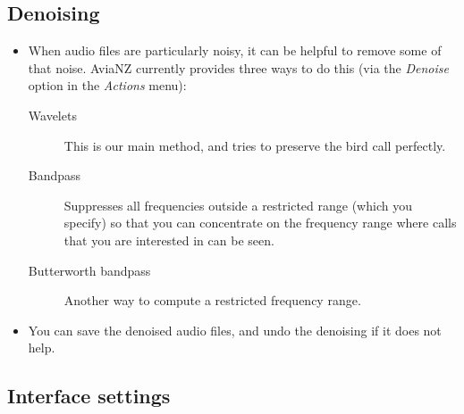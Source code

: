 \documentclass{scrartcl}
\begin{document}
\begin{itemize}
\end{itemize}

\subsection{Denoising}\label{sec:denoising}

\begin{itemize}
	\item When audio files are particularly noisy, it can be helpful to remove some of that noise. AviaNZ currently provides three ways to do this (via the \textit{Denoise} option in the \textit{Actions} menu):
\begin{description}
\item[Wavelets] This is our main method, and tries to preserve the bird call perfectly. 
\item[Bandpass] Suppresses all frequencies outside a restricted range (which you specify) so that you can concentrate on the frequency range where calls that you are interested in can be seen.
\item[Butterworth bandpass] Another way to compute a restricted frequency range.
\end{description}
\item You can save the denoised audio files, and undo the denoising if it does not help.
\end{itemize}

\subsection{Interface settings}\label{sec:interfacesettings}
\end{document}
